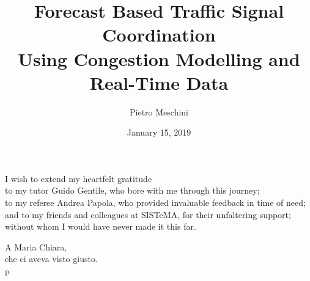 \documentclass[11pt,a4paper,twoside]{book}
\author{Pietro Meschini}
\title{Forecast Based Traffic Signal Coordination\\ Using Congestion Modelling and Real-Time Data}
\date{January 15, 2019}
\begin{document}
\frontmatter
\maketitle

\begin{dedica}
	I wish to extend my heartfelt gratitude\\
	to my tutor Guido Gentile, who bore with me through this journey;\\
	to my referee Andrea Papola, who provided invaluable feedback in time of need;\\
	and to my friends and colleagues at SISTeMA, for their unfaltering support;\\
	without whom I would have never made it this far.
    \par   %
    \vspace{2\baselineskip}
    \Large
	A Maria Chiara,\\
	che ci aveva visto giusto.\\
    \vspace{\baselineskip}
    p
  \end{dedica}



\tableofcontents



\mainmatter




 






%

%





\nocite{*}



\appendix

\end{document}
